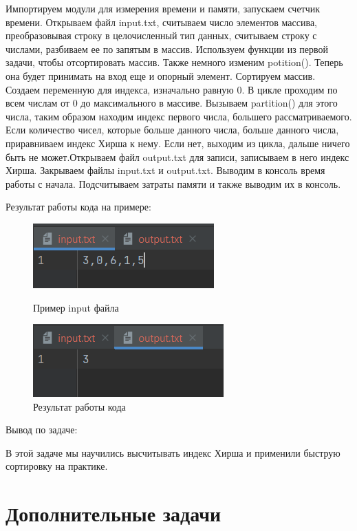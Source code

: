 Импортируем модули для измерения времени и памяти, запускаем счетчик времени. Открываем файл input.txt, считываем число элементов массива, преобразовывая строку в целочисленный тип данных, считываем строку с числами, разбиваем ее по запятым в массив. Используем функции из первой задачи, чтобы отсортировать массив. Также немного изменим potition(). Теперь она будет принимать  на вход еще и опорный элемент. Сортируем массив. Создаем переменную для индекса, изначально равную 0. В цикле проходим по всем числам от 0 до максимального в массиве. Вызываем partition() для этого числа, таким образом находим индекс первого числа, большего рассматриваемого. Если количество чисел, которые больше данного числа, больше данного числа, приравниваем индекс Хирша к нему. Если нет, выходим из цикла, дальше ничего быть не может.Открываем файл output.txt для записи, записываем в него индекс Хирша. Закрываем файлы input.txt и output.txt. Выводим в консоль время работы с начала. Подсчитываем затраты памяти и также выводим их в консоль.

Результат работы кода на примере:

\begin{figure}[H]
	\begin{center}
		\includegraphics[scale=1.1]{fig/input12.png}
		\caption{Пример input файла}
		\label{pic:input12} %
	\end{center}
        \begin{center}
		\includegraphics[scale=1]{fig/output12.png}
		\caption{Результат работы кода}
		\label{pic:output12} %
	\end{center}
\end{figure}

Вывод по задаче:

В этой задаче мы научились высчитывать индекс Хирша и применили быструю сортировку на практике.
 
\section{Дополнительные задачи}

